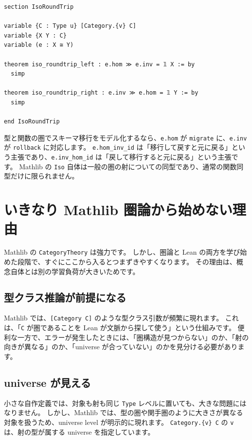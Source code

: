 \begin{listing}[htbp]
\begin{verbatim}
section IsoRoundTrip

variable {C : Type u} [Category.{v} C]
variable {X Y : C}
variable (e : X ≅ Y)

theorem iso_roundtrip_left : e.hom ≫ e.inv = 𝟙 X := by
  simp

theorem iso_roundtrip_right : e.inv ≫ e.hom = 𝟙 Y := by
  simp

end IsoRoundTrip
\end{verbatim}
\caption{\texttt{iso\_roundtrip\_left}・\texttt{iso\_roundtrip\_right}}
\label{lst:ch40_iso_roundtrip}
\end{listing}

型と関数の圏でスキーマ移行をモデル化するなら、\texttt{e.hom} が \texttt{migrate} に、\texttt{e.inv} が \texttt{rollback} に対応します。
\texttt{e.hom\_inv\_id} は「移行して戻すと元に戻る」という主張であり、\texttt{e.inv\_hom\_id} は「戻して移行すると元に戻る」という主張です。
Mathlib の \texttt{Iso} 自体は一般の圏の射についての同型であり、通常の関数同型だけに限られません。

\section{いきなり Mathlib 圏論から始めない理由}

Mathlib の \texttt{CategoryTheory} は強力です。
しかし、圏論と Lean の両方を学び始めた段階で、すぐにここから入るとつまずきやすくなります。
その理由は、概念自体とは別の学習負荷が大きいためです。

\subsection{型クラス推論が前提になる}

Mathlib では、\texttt{[Category C]} のような型クラス引数が頻繁に現れます。
これは、「\texttt{C} が圏であることを Lean が文脈から探して使う」という仕組みです。
便利な一方で、エラーが発生したときには、「圏構造が見つからない」のか、「射の向きが異なる」のか、「universe が合っていない」のかを見分ける必要があります。

\subsection{universe が見える}

小さな自作定義では、対象も射も同じ \texttt{Type} レベルに置いても、大きな問題にはなりません。
しかし、Mathlib では、型の圏や関手圏のように大きさが異なる対象を扱うため、universe level が明示的に現れます。
\texttt{Category.\{v\} C} の \texttt{v} は、射の型が属する universe を指定しています。

